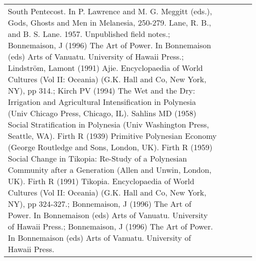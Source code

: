 \begin{longtable}{p{2cm}p{2cm}p{2cm}p{5cm}p{7cm}}
South Pentecost. In P. Lawrence and M. G. Meggitt (eds.), Gods, Ghosts and Men in Melanesia, 250-279. Lane, R. B., and B. S. Lane. 1957. Unpublished field notes.; Bonnemaison, J (1996) The Art of Power. In Bonnemaison (eds) Arts of Vanuatu. University of Hawaii Press.; Lindström, Lamont (1991) Ajie. Encyclopaedia of World Cultures (Vol II: Oceania) (G.K. Hall and Co, New York, NY), pp 314.; Kirch PV (1994) The Wet and the Dry: Irrigation and Agricultural Intensification in Polynesia (Univ Chicago Press, Chicago, IL). Sahlins MD (1958) Social Stratification in Polynesia (Univ Washington Press, Seattle, WA). Firth R (1939) Primitive Polynesian Economy (George Routledge and Sons, London, UK). Firth R (1959) Social Change in Tikopia: Re-Study of a Polynesian Community after a Generation (Allen and Unwin, London, UK). Firth R (1991) Tikopia. Encyclopaedia of World Cultures (Vol II: Oceania) (G.K. Hall and Co, New York, NY), pp 324-327.; Bonnemaison, J (1996) The Art of Power. In Bonnemaison (eds) Arts of Vanuatu. University of Hawaii Press.; Bonnemaison, J (1996) The Art of Power. In Bonnemaison (eds) Arts of Vanuatu. University of Hawaii Press. \\ 

\end{longtable}
